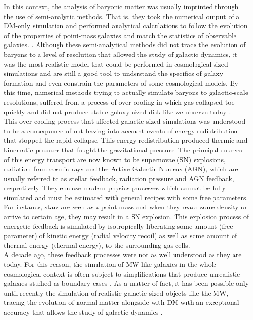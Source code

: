 In this context, the analysis of baryonic matter was usually imprinted through the use of semi-analytic methods. That is, they took the numerical output of a DM-only simulation and performed analytical calculations to follow the evolution of the properties of point-mass galaxies and match the statistics of observable galaxies. \cite{Lemson_et_al._2006,De_Lucia_et_al._2006}. Although these semi-analytical methods did not trace the evolution of baryons to a level of resolution that allowed the study of galactic dynamics, it was the most realistic model that could be performed in cosmological-sized simulations and are still a good tool to understand the specifics of galaxy formation and even constrain the parameters of some cosmological models. By this time, numerical methods trying to actually simulate baryons to galactic-scale resolutions, suffered from a process of over-cooling in which gas collapsed too quickly and did not produce stable galaxy-sized disk like we observe today \cite{Katz_and_Gunn_1991}.\\

This over-cooling process that affected galactic-sized simulations was understood to be a consequence of not having into account events of energy redistribution that stopped the rapid collapse. This energy redistribution produced thermic and kinematic pressure that fought the gravitational pressure. The principal sources of this energy transport are now known to be supernovae (SN) explosions, radiation from cosmic rays and the Active Galactic Nucleus (AGN), which are usually referred to as stellar feedback, radiation pressure and AGN feedback, respectively. They enclose modern physics processes which cannot be fully simulated and must be estimated with general recipes with some free parameters. For instance, stars are seen as a point mass and when they reach some density or arrive to certain age, they may result in a SN explosion.  This explosion process of energetic feedback is simulated by isotropically liberating some amount (free parameter) of kinetic energy (radial velocity recoil) as well as some amount of thermal energy (thermal energy), to the surrounding gas cells. \\

 A decade ago, these feedback processes were not as well understood as they are today. For this reason, the simulation of MW-like galaxies in the whole cosmological context is often subject to simplifications that produce unrealistic galaxies studied as boundary cases \cite{Bryan(unrealistic galaxies)}. As a matter of fact, it has been possible only until recently the simulation of realistic galactic-sized objects like the MW, tracing the evolution of normal matter alongside with DM with an exceptional accuracy that allows the study of galactic dynamics \cite{Auriga}.\\
 

